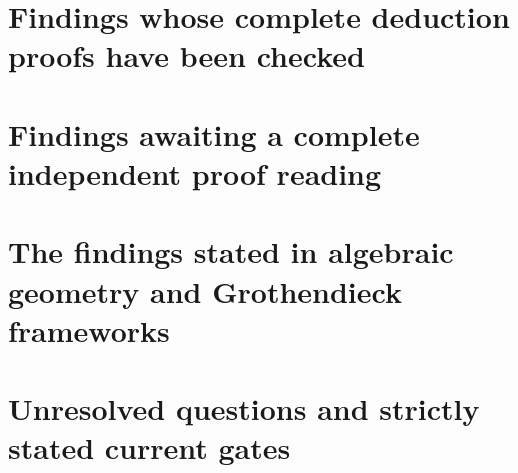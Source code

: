 \documentclass[11pt]{article}
\theoremstyle{definition}
\begin{document}
\part{Findings whose complete deduction proofs have been checked}


\part{Findings awaiting a complete independent proof reading}

\part{The findings stated in algebraic geometry and Grothendieck frameworks}

\part{Unresolved questions and strictly stated current gates}

\end{document}
